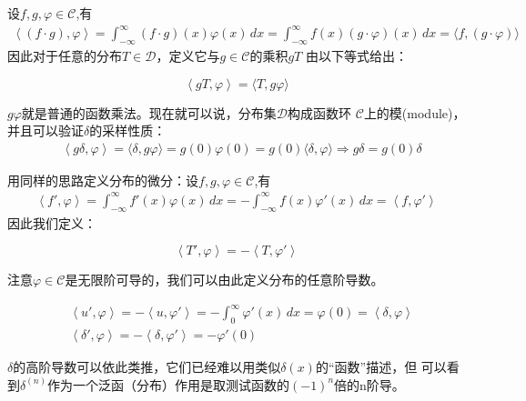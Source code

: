 \documentclass{ctexbook}
\begin{document}
设$f,g,\varphi\in\mathcal{C} $,有
\begin{align*}
    \left\langle (f\cdot g),\varphi\right\rangle=\int_{-\infty}^{\infty}(f\cdot g)(x)\varphi(x)\,dx=\int_{-\infty}^{\infty}f(x)(g\cdot\varphi)(x)\,dx=\langle f,(g\cdot\varphi)\rangle
\end{align*}
因此对于任意的分布$T\in\mathcal{D} $，定义它与$g\in\mathcal{C} $的乘积$gT$
由以下等式给出：
\begin{definition}[分布与函数的乘法]
    \begin{equation*}
    \left\langle gT,\varphi\right\rangle=\langle T,g\varphi\rangle
\end{equation*}
\end{definition}
$g\varphi$就是普通的函数乘法。现在就可以说，分布集$\mathcal{D} $构成函数环
$\mathcal{C} $上的模(module)，并且可以验证$\delta$的采样性质：
\begin{align*}
     & \left\langle g\delta,\varphi\right\rangle=\langle \delta,g\varphi\rangle=g(0)\varphi(0)=g(0)\langle\delta,\varphi\rangle \Rightarrow  g\delta=g(0)\delta
\end{align*}

用同样的思路定义分布的微分：设$f,g,\varphi\in\mathcal{C} $,有
\begin{align*}
    \left\langle f',\varphi\right\rangle=\int_{-\infty}^{\infty}f'(x)\varphi(x)\,dx=-\int_{-\infty}^{\infty}f(x)\varphi'(x)\,dx=\left\langle f,\varphi'\right\rangle
\end{align*}
因此我们定义：
\begin{definition}[分布的微分]
    \begin{equation*}
    \left\langle T',\varphi\right\rangle=-\left\langle T,\varphi'\right\rangle
\end{equation*}
\end{definition}
注意$\varphi\in\mathcal{C} $是无限阶可导的，我们可以由此定义分布的任意阶导数。
\begin{example}
\begin{align*}
     & \left\langle u',\varphi\right\rangle=-\left\langle u,\varphi'\right\rangle=-\int_{0}^{\infty}\varphi'(x)\,dx=\varphi(0)=\left\langle\delta,\varphi\right\rangle \\
     & \left\langle \delta',\varphi\right\rangle=-\left\langle \delta,\varphi'\right\rangle=-\varphi'(0)
\end{align*}
\end{example}
$\delta$的高阶导数可以依此类推，它们已经难以用类似$\delta(x)$的“函数”描述，但
可以看到$\delta^{(n)}$作为一个泛函（分布）作用是取测试函数的$(-1)^n$倍的n阶导。
\end{document}
